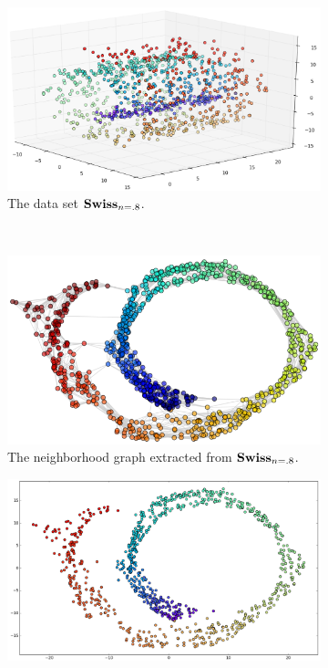 \begin{description}
	\begin{figure}[H]
		\centering
		\begin{subfigure}{.40\linewidth}
			\centering
			\includegraphics[width=\linewidth]{img/noise/sr/1}
			\captionsetup{justification=centering}
			\caption{The data set $\mathbf{Swiss}_{n=.8}$.}
		\end{subfigure}~
		\begin{subfigure}{.35\linewidth}
			\centering
			\includegraphics[width=\linewidth]{img/noise/sr/3}
			\captionsetup{justification=centering}
			\caption{The neighborhood graph extracted from $\mathbf{Swiss}_{n=.8}$.}
			\label{fig:noise_3}
		\end{subfigure}
		\newline\newline\newline
		\begin{subfigure}{.45\linewidth}
			\centering
			\includegraphics[width=\linewidth]{img/noise/sr/2}

\end{subfigure}
\end{figure}
\end{description}
